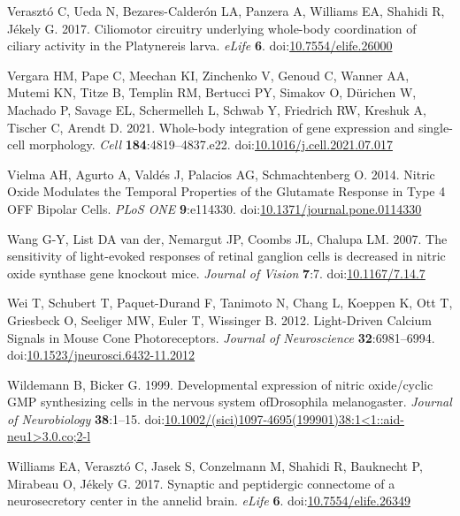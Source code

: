 \documentclass[
  10pt,
  onecolumn]{article}
\newlength{\cslhangindent}
\newlength{\cslentryspacingunit} %
\newenvironment{CSLReferences}[2] %
 {%
  \setlength{\parindent}{0pt}
  \ifodd #1
  \let\oldpar\par
  \def\par{\hangindent=\cslhangindent\oldpar}
  \fi
  \setlength{\parskip}{#2\cslentryspacingunit}
 }%
 {}
\begin{document}
\begin{CSLReferences}{1}{0}
\leavevmode{}%
Verasztó C, Ueda N, Bezares-Calderón LA, Panzera A, Williams EA, Shahidi
R, Jékely G. 2017. Ciliomotor circuitry underlying whole-body
coordination of ciliary activity in the Platynereis larva. \emph{eLife}
\textbf{6}.
doi:\href{https://doi.org/10.7554/elife.26000}{10.7554/elife.26000}

\leavevmode{}%
Vergara HM, Pape C, Meechan KI, Zinchenko V, Genoud C, Wanner AA, Mutemi
KN, Titze B, Templin RM, Bertucci PY, Simakov O, Dürichen W, Machado P,
Savage EL, Schermelleh L, Schwab Y, Friedrich RW, Kreshuk A, Tischer C,
Arendt D. 2021. Whole-body integration of gene expression and
single-cell morphology. \emph{Cell} \textbf{184}:4819--4837.e22.
doi:\href{https://doi.org/10.1016/j.cell.2021.07.017}{10.1016/j.cell.2021.07.017}

\leavevmode{}%
Vielma AH, Agurto A, Valdés J, Palacios AG, Schmachtenberg O. 2014.
Nitric Oxide Modulates the Temporal Properties of the Glutamate Response
in Type 4 OFF Bipolar Cells. \emph{PLoS ONE} \textbf{9}:e114330.
doi:\href{https://doi.org/10.1371/journal.pone.0114330}{10.1371/journal.pone.0114330}

\leavevmode{}%
Wang G-Y, List DA van der, Nemargut JP, Coombs JL, Chalupa LM. 2007. The
sensitivity of light-evoked responses of retinal ganglion cells is
decreased in nitric oxide synthase gene knockout mice. \emph{Journal of
Vision} \textbf{7}:7.
doi:\href{https://doi.org/10.1167/7.14.7}{10.1167/7.14.7}

\leavevmode{}%
Wei T, Schubert T, Paquet-Durand F, Tanimoto N, Chang L, Koeppen K, Ott
T, Griesbeck O, Seeliger MW, Euler T, Wissinger B. 2012. Light-Driven
Calcium Signals in Mouse Cone Photoreceptors. \emph{Journal of
Neuroscience} \textbf{32}:6981--6994.
doi:\href{https://doi.org/10.1523/jneurosci.6432-11.2012}{10.1523/jneurosci.6432-11.2012}

\leavevmode{}%
Wildemann B, Bicker G. 1999. Developmental expression of nitric
oxide/cyclic GMP synthesizing cells in the nervous system ofDrosophila
melanogaster. \emph{Journal of Neurobiology} \textbf{38}:1--15.
doi:\href{https://doi.org/10.1002/(sici)1097-4695(199901)38:1\%3C1::aid-neu1\%3E3.0.co;2-l}{10.1002/(sici)1097-4695(199901)38:1\textless1::aid-neu1\textgreater3.0.co;2-l}

\leavevmode{}%
Williams EA, Verasztó C, Jasek S, Conzelmann M, Shahidi R, Bauknecht P,
Mirabeau O, Jékely G. 2017. Synaptic and peptidergic connectome of a
neurosecretory center in the annelid brain. \emph{eLife} \textbf{6}.
doi:\href{https://doi.org/10.7554/elife.26349}{10.7554/elife.26349}


\end{CSLReferences}
\end{document}
